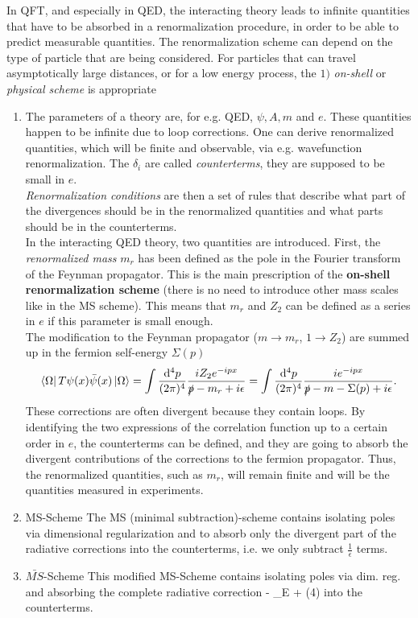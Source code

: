 In QFT, and especially in QED, the interacting theory leads to infinite quantities that have to be absorbed in a renormalization procedure, in order to be able to predict measurable quantities. The renormalization scheme can depend on the type of particle that are being considered. For particles that can travel asymptotically large distances, or for a low energy process, the $1)$ \emph{on-shell} or \emph{physical scheme} is appropriate
\begin{enumerate}
	\item The parameters of a theory are, for e.g. QED, $\psi, A, m$ and $e$. These quantities happen to be infinite due to loop corrections. One can derive renormalized quantities, which will be finite and observable, via e.g. wavefunction renormalization. The $\delta_i$ are called \emph{counterterms}, they are supposed to be small in $e$.\\
	\emph{Renormalization conditions} are then a set of rules that describe what part of the divergences should be in the renormalized quantities and what parts should be in the counterterms.\\
	In the interacting QED theory, two quantities are introduced. First, the \emph{renormalized mass} $m_r$ has been defined as the pole in the Fourier transform of the Feynman propagator. This is the main prescription of the \textbf{on-shell renormalization scheme} (there is no need to introduce other mass scales like in the MS scheme). This means that $m_r$ and $Z_2$ can be defined as a series in $e$ if this parameter is small enough.\\
	The modification to the Feynman propagator ($m\rightarrow m_r$, $1\rightarrow Z_2$) are summed up in the fermion self-energy $\Sigma(p)$
	\begin{equation}
		\bra{\Omega}T\psi(x) \bar{\psi}(x)\ket{\Omega} = \int \frac{\mathrm{d}^4 p}{(2 \pi)^4} \frac{iZ_2 e^{-ipx}}{\slashed{p} -m_r+i\epsilon} = \int \frac{\mathrm{d}^4 p}{(2 \pi)^4} \frac{i e^{-i p x}}{\slashed{p} - m-\Sigma(p) +i\epsilon}.
	\end{equation}
	These corrections are often divergent because they contain loops. By identifying the two expressions of the correlation function up to a certain order in $e$, the counterterms can be defined, and they are going to absorb the divergent contributions of the corrections to the fermion propagator. Thus, the renormalized quantities, such as $m_r$, will remain finite and will be the quantities measured in experiments.
	\item \begin{mybox}{MS-Scheme}
	The MS (minimal subtraction)-scheme contains isolating poles via dimensional regularization and to absorb only the divergent part of the radiative corrections into the counterterms, i.e. we only subtract $\frac{1}{\epsilon}$ terms.
	\end{mybox}
\item \begin{mybox}{$\bar{MS}$-Scheme}
	This modified MS-Scheme contains isolating poles via dim. reg. and absorbing the complete radiative correction 
	\bse 
	 - \gamma_{E} + \ln(4\pi) 
	\ese 
	into the counterterms.
\end{mybox}
\end{enumerate}
